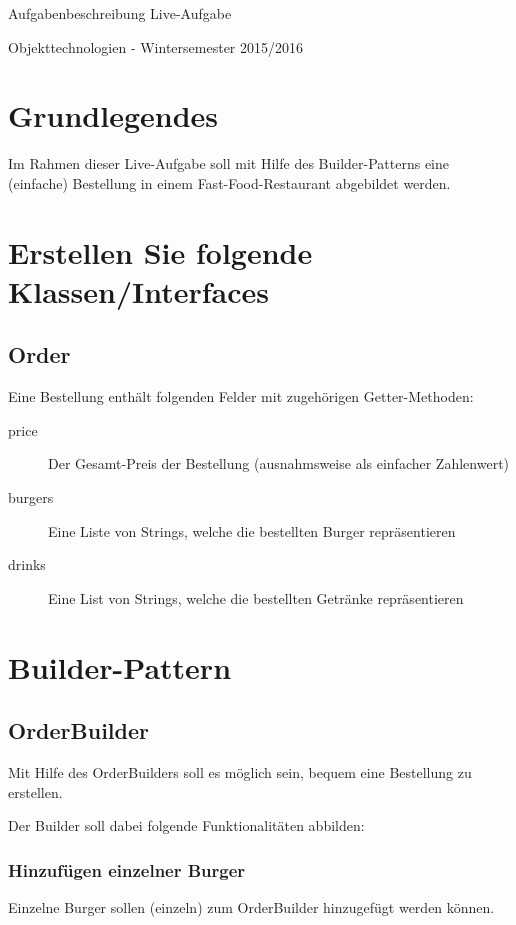 \documentclass[oneside,a4paper]{scrartcl}
\author{Johannes Schneider}
\begin{document}
\centerline{\sc \large Aufgabenbeschreibung Live-Aufgabe}
\vspace{.5pc}
\centerline{\sc Objekttechnologien - Wintersemester 2015/2016}
\vspace{2pc}



\section{Grundlegendes}

Im Rahmen dieser Live-Aufgabe soll mit Hilfe des Builder-Patterns eine (einfache) Bestellung in einem Fast-Food-Restaurant abgebildet werden.


\section{Erstellen Sie folgende Klassen/Interfaces}
\subsection{Order}

Eine Bestellung enthält folgenden Felder mit zugehörigen Getter-Methoden:

\begin{description}
  \item[price] Der Gesamt-Preis der Bestellung (ausnahmsweise als einfacher Zahlenwert)
  \item[burgers] Eine Liste von Strings, welche die bestellten Burger repräsentieren
  \item[drinks] Eine List von Strings, welche die bestellten Getränke repräsentieren
\end{description}


\section{Builder-Pattern}

\subsection{OrderBuilder}

Mit Hilfe des OrderBuilders soll es möglich sein, bequem eine Bestellung zu erstellen.

Der Builder soll dabei folgende Funktionalitäten abbilden:

\subsubsection{Hinzufügen einzelner Burger}
Einzelne Burger sollen (einzeln) zum OrderBuilder hinzugefügt werden können.
\end{document}
